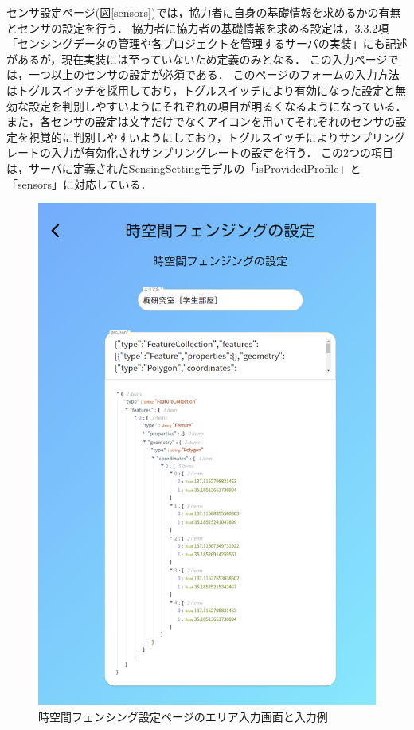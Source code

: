 センサ設定ページ(図\ref{sensors})では，協力者に自身の基礎情報を求めるかの有無とセンサの設定を行う．
協力者に協力者の基礎情報を求める設定は，3.3.2項「センシングデータの管理や各プロジェクトを管理するサーバの実装」にも記述があるが，現在実装には至っていないため定義のみとなる．
この入力ページでは，一つ以上のセンサの設定が必須である．
このページのフォームの入力方法はトグルスイッチを採用しており，トグルスイッチにより有効になった設定と無効な設定を判別しやすいようにそれぞれの項目が明るくなるようになっている．
また，各センサの設定は文字だけでなくアイコンを用いてそれぞれのセンサの設定を視覚的に判別しやすいようにしており，トグルスイッチによりサンプリングレートの入力が有効化されサンプリングレートの設定を行う．
この2つの項目は，サーバに定義されたSensingSettingモデルの「isProvidedProfile」と「sensors」に対応している．
\begin{figure}[H]
  \centering
  \includegraphics[width=120mm]{areaInput.png}
  \caption{時空間フェンシング設定ページのエリア入力画面と入力例}
  \label{areaInput}
\end{figure}

